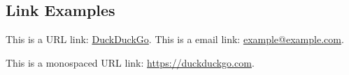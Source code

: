 
\begin{fullwidth}

    \section{Link Examples}

    This is a URL link: \href{https://www.duckduckgo.com}{DuckDuckGo}.
    This is a email link: \href{mailto:example@example.com}{example@example.com}.

    This is a monospaced URL link: \url{https://duckduckgo.com}.

\end{fullwidth}
